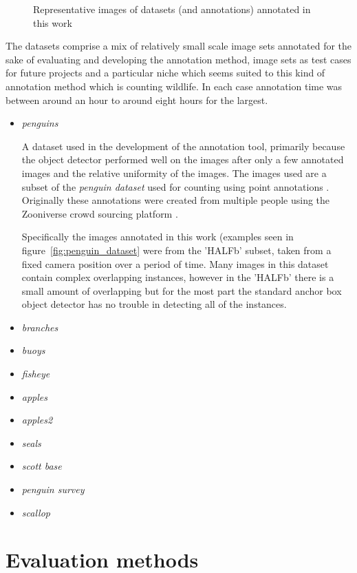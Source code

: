 \begin{figure}[h!]
\caption{Representative images of datasets (and annotations) annotated in this work}
\label{fig:datasets_all}
\end{figure}

The datasets comprise a mix of relatively small scale image sets annotated for the sake of evaluating and developing the annotation method, image sets as test cases for future projects and a particular niche which seems suited to this kind of annotation method which is counting wildlife. In each case annotation time was between around an hour to around eight hours for the largest.

\begin{itemize}
    \item{\emph{penguins}}\par
A dataset used in the development of the annotation tool, primarily because the object detector performed well on the images after only a few annotated images and the relative uniformity of the images. The images used are a subset of the \emph{penguin dataset} \cite{PenguinData} used for counting using point annotations \cite{Arteta2016}. Originally these annotations were created from multiple people using the Zooniverse crowd sourcing platform \cite{Zooniverse}. 

Specifically the images annotated in this work (examples seen in figure~\ref{fig:penguin_dataset} were from the 'HALFb' subset, taken from a fixed camera position over a period of time. Many images in this dataset contain complex overlapping instances, however in the 'HALFb' there is a small amount of overlapping but for the most part the standard anchor box object detector has no trouble in detecting all of the instances.    
    \item{\emph{branches}}
    \item{\emph{buoys}}
    \item{\emph{fisheye}}
    \item{\emph{apples}}
    \item{\emph{apples2}}
    \item{\emph{seals}}
    \item{\emph{scott base}}
    \item{\emph{penguin survey}}
    \item{\emph{scallop}}
\end{itemize}



\section {Evaluation methods}
\label{sec:ann_evaluation}

